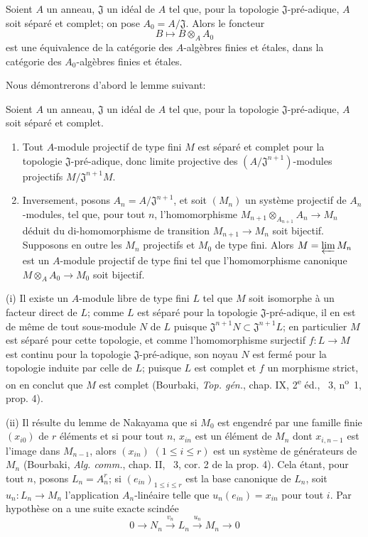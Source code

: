 \begin{proposition}[18.3.2]
\label{IV.18.3.2}
Soient $A$ un anneau, $\mathfrak J$ un idéal de $A$ tel que, pour la topologie $\mathfrak J$-pré-adique, $A$ soit séparé et complet; on pose $A_0=A/\mathfrak J$. Alors le foncteur
\[
  B\longmapsto B\otimes_A A_0
\]
est une équivalence de la catégorie des $A$-algèbres finies et étales, dans la catégorie des $A_0$-algèbres finies et étales.
\end{proposition}

Nous démontrerons d'abord le lemme suivant:

\begin{lemma}[18.3.2.1]
\label{IV.18.3.2.1}
Soient $A$ un anneau, $\mathfrak J$ un idéal de $A$ tel que, pour la topologie $\mathfrak J$-pré-adique, $A$ soit séparé et complet.
\begin{enumerate}
  \item[(i)] Tout $A$-module projectif de type fini $M$ est séparé et complet pour la topologie $\mathfrak J$-pré-adique, donc limite projective des $(A/\mathfrak J^{n+1})$-modules projectifs $M/\mathfrak J^{n+1}M$.
  \item[(ii)] Inversement, posons $A_n=A/\mathfrak J^{n+1}$, et soit $(M_n)$ un système projectif de $A_n$-modules, tel que, pour tout $n$, l'homomorphisme $M_{n+1}\otimes_{A_{n+1}}A_n\to M_n$ déduit du di-homomorphisme de transition $M_{n+1}\to M_n$ soit bijectif. Supposons en outre les $M_n$ projectifs et $M_0$ de type fini. Alors $M=\varprojlim M_n$ est un $A$-module projectif de type fini tel que l'homomorphisme canonique $M\otimes_A A_0\to M_0$ soit bijectif.
\end{enumerate}
\end{lemma}

(i) Il existe un $A$-module libre de type fini $L$ tel que $M$ soit isomorphe à un facteur direct de $L$; comme $L$ est séparé pour la topologie $\mathfrak J$-pré-adique, il en est de même de tout sous-module $N$ de $L$ puisque $\mathfrak J^{n+1}N\subset\mathfrak J^{n+1}L$; en particulier $M$ est séparé pour cette topologie, et comme l'homomorphisme surjectif $f:L\to M$ est continu pour la topologie $\mathfrak J$-pré-adique, son noyau $N$ est fermé pour la topologie induite par celle de $L$; puisque $L$ est complet et $f$ un morphisme strict, on en conclut que $M$ est complet (Bourbaki, \emph{Top. gén.}, chap. IX, 2\textsuperscript{e} éd., \textsection~3, n\textsuperscript{o}~1, prop. 4).

(ii) Il résulte du lemme de Nakayama que si $M_0$ est engendré par une famille finie $(x_{i0})$ de $r$ éléments et si pour tout $n$, $x_{in}$ est un élément de $M_n$ dont $x_{i,n-1}$ est l'image dans $M_{n-1}$, alors $(x_{in})$ $(1\leq i\leq r)$ est un système de générateurs de $M_n$ (Bourbaki, \emph{Alg. comm.}, chap. II, \textsection~3, cor. 2 de la prop. 4). Cela étant, pour tout $n$, posons $L_n=A_n^r$; si $(e_{in})_{1\leq i\leq r}$ est la base canonique de $L_n$, soit $u_n:L_n\to M_n$ l'application $A_n$-linéaire telle que $u_n(e_{in})=x_{in}$ pour tout $i$. Par hypothèse on a une suite exacte scindée
\[
  0\longrightarrow N_n\xrightarrow{v_n}L_n\xrightarrow{u_n}M_n\longrightarrow 0
\]

